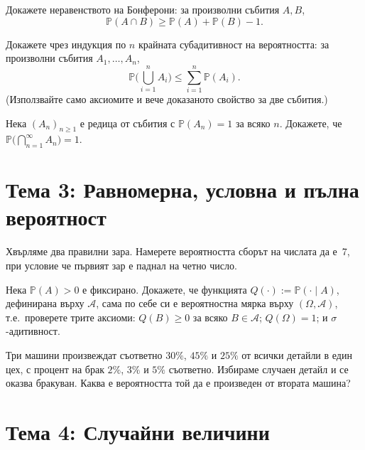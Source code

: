 \begin{probbox}[Задача 2.1]
Докажете неравенството на Бонферони: за произволни събития $A,B$,
\[
  \mathbb P(A\cap B) \ge \mathbb P(A)+\mathbb P(B)-1.
\]
\end{probbox}

\begin{probbox}[Задача 2.2]
Докажете чрез индукция по $n$ крайната субадитивност на вероятността:
за произволни събития $A_1,\dots,A_n$,
\[
  \mathbb P\Big(\bigcup_{i=1}^n A_i\Big) \le \sum_{i=1}^n \mathbb P(A_i).
\]
(Използвайте само аксиомите и вече доказаното свойство за две
събития.)
\end{probbox}

\begin{probbox}[Задача 2.3]
Нека $(A_n)_{n\ge1}$ е редица от събития с $\mathbb P(A_n)=1$ за
всяко $n$. Докажете, че $\mathbb P\big(\bigcap_{n=1}^{\infty}
A_n\big)=1$.
\end{probbox}

\section*{Тема 3: Равномерна, условна и пълна вероятност}

\begin{probbox}[Задача 3.1]
Хвърляме два правилни зара. Намерете вероятността сборът на числата
да е~7, при условие че първият зар е паднал на четно число.
\end{probbox}

\begin{probbox}[Задача 3.2]
Нека $\mathbb P(A)>0$ е фиксирано. Докажете, че функцията
$Q(\cdot):=\mathbb P(\cdot\mid A)$, дефинирана върху $\mathcal A$,
сама по себе си е вероятностна мярка върху $(\Omega,\mathcal A)$,
т.е.\ проверете трите аксиоми: $Q(B)\ge0$ за всяко $B\in\mathcal A$;
$Q(\Omega)=1$; и $\sigma$-адитивност.
\end{probbox}

\begin{probbox}[Задача 3.3]
Три машини произвеждат съответно $30\%$, $45\%$ и $25\%$ от всички
детайли в един цех, с процент на брак $2\%$, $3\%$ и $5\%$
съответно. Избираме случаен детайл и се оказва бракуван. Каква е
вероятността той да е произведен от втората машина?
\end{probbox}

\section*{Тема 4: Случайни величини}


